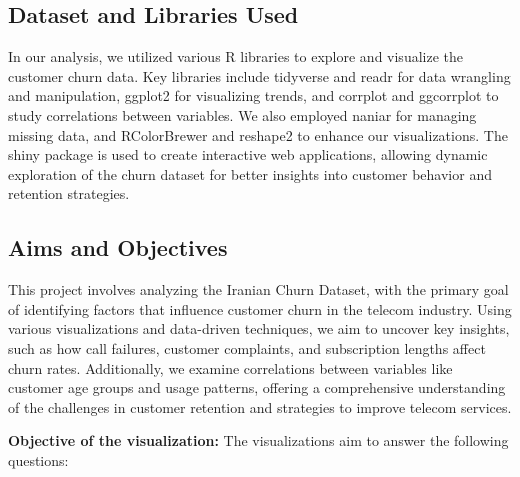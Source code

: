 \documentclass[12pt]{article}
\begin{document}
\subsection{Dataset and Libraries Used}
In our analysis, we utilized various R libraries to explore and visualize the customer churn data. Key libraries include tidyverse and readr for data wrangling and manipulation, ggplot2 for visualizing trends, and corrplot and ggcorrplot to study correlations between variables. We also employed naniar for managing missing data, and RColorBrewer and reshape2 to enhance our visualizations. The shiny package is used to create interactive web applications, allowing dynamic exploration of the churn dataset for better insights into customer behavior and retention strategies.


\subsection{Aims and Objectives}
This project involves analyzing the Iranian Churn Dataset, with the primary goal of identifying factors that influence customer churn in the telecom industry. Using various visualizations and data-driven techniques, we aim to uncover key insights, such as how call failures, customer complaints, and subscription lengths affect churn rates. Additionally, we examine correlations between variables like customer age groups and usage patterns, offering a comprehensive understanding of the challenges in customer retention and strategies to improve telecom services.

\vspace{0.5cm}

\textbf{Objective of the visualization:} The visualizations aim to answer the following questions:
\end{document}
